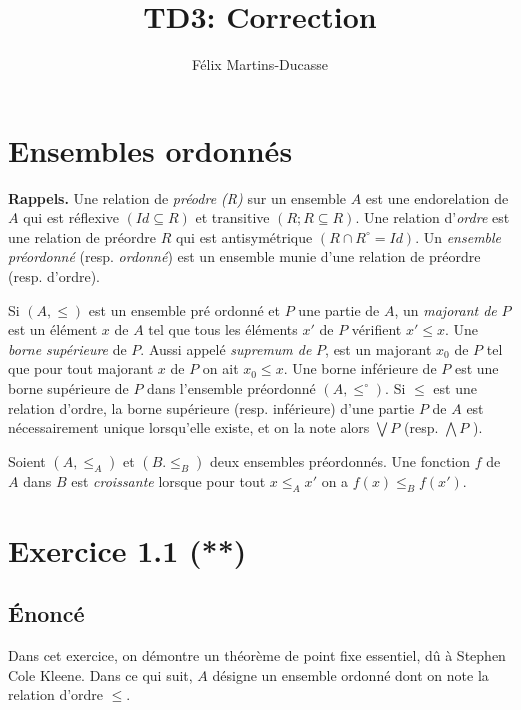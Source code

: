 \documentclass[12pt]{article}
\begin{document}
\def\tobar{\mathrel{\mkern3mu \vcenter{\hbox{$\scriptscriptstyle+$}}\mkern-12mu{\to}}}


\title{\textbf{TD3: Correction }}
\author{Félix Martins-Ducasse}
\date{}
\maketitle

\section*{Ensembles ordonnés}
\textbf{Rappels.}   Une relation de \textit{préodre (R)} sur un ensemble $A$ est une endorelation de $A$ qui est réflexive  $(Id \subseteq R)$ et transitive $(R;R \subseteq R)$. Une relation d'\textit{ordre} est une relation de préordre $R$ qui est antisymétrique $(R \cap R^\circ = Id)$. Un \textit{ensemble préordonné} (resp. \textit{ordonné}) est un ensemble munie d'une relation de préordre (resp. d'ordre).

Si $(A,\leq)$ est un ensemble pré ordonné et $P$ une partie de $A$, un \textit{majorant de } $P$ est un élément $x$ de $A$ tel que tous les éléments $x'$ de $P$ vérifient $x'\leq x$. Une \textit{borne supérieure} de $P$. Aussi appelé \textit{supremum de } $P$, est un majorant $x_0$ de $P$ tel que pour tout majorant $x$ de $P$ on ait $x_0 \leq x$. Une borne inférieure de $P$ est une borne supérieure de $P$ dans l'ensemble préordonné $(A, \leq^\circ)$. Si $\leq$ est une relation d'ordre, la borne supérieure (resp. inférieure) d'une partie $P$ de $A$ est nécessairement unique lorsqu'elle existe, et on la note alors $\bigvee P$ (resp. $ \bigwedge  P$ ).

Soient $(A, \leq_A)$ et $(B. \leq_B)$ deux ensembles préordonnés. Une fonction $f$ de $A$ dans $B$ est \textit{croissante}  lorsque pour tout $x\leq_A x'$ on a $f(x) \leq_B f(x')$.

\section*{Exercice 1.1 (**)}

\subsection*{Énoncé} 

Dans cet exercice, on démontre un théorème de point fixe essentiel,
dû à Stephen Cole Kleene. Dans ce qui suit, $A$ désigne un ensemble ordonné dont on
note la relation d’ordre $\leq$.  
\end{document}
